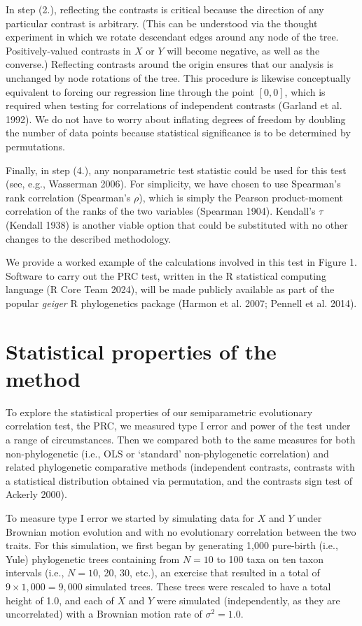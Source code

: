 \documentclass[fleqn,10pt,lineno]{wlpeerj} %
\begin{document}
In step (2.), reflecting the contrasts is critical because the direction of any particular contrast is arbitrary. (This can be understood via the thought experiment in which we rotate descendant edges around any node of the tree. Positively-valued contrasts in \(X\) or \(Y\) will become negative, as well as the converse.) Reflecting contrasts around the origin ensures that our analysis is unchanged by node rotations of the tree. This procedure is likewise conceptually equivalent to forcing our regression line through the point \([0,0]\), which is required when testing for correlations of independent contrasts (Garland et al. 1992). We do not have to worry about inflating degrees of freedom by doubling the number of data points because statistical significance is to be determined by permutations.

Finally, in step (4.), any nonparametric test statistic could be used for this test (see, e.g., Wasserman 2006). For simplicity, we have chosen to use Spearman's rank correlation (Spearman's \(\rho\)), which is simply the Pearson product-moment correlation of the ranks of the two variables (Spearman 1904). Kendall's \(\tau\) (Kendall 1938) is another viable option that could be substituted with no other changes to the described methodology.

We provide a worked example of the calculations involved in this test in Figure 1. Software to carry out the PRC test, written in the R statistical computing language (R Core Team 2024), will be made publicly available as part of the popular \emph{geiger} R phylogenetics package (Harmon et al. 2007; Pennell et al. 2014).

\section{Statistical properties of the method}\label{statistical-properties-of-the-method}

To explore the statistical properties of our semiparametric evolutionary correlation test, the PRC, we measured type I error and power of the test under a range of circumstances. Then we compared both to the same measures for both non-phylogenetic (i.e., OLS or `standard' non-phylogenetic correlation) and related phylogenetic comparative methods (independent contrasts, contrasts with a statistical distribution obtained via permutation, and the contrasts sign test of Ackerly 2000).

To measure type I error we started by simulating data for \(X\) and \(Y\) under Brownian motion evolution and with no evolutionary correlation between the two traits. For this simulation, we first began by generating 1,000 pure-birth (i.e., Yule) phylogenetic trees containing from \(N=10\) to 100 taxa on ten taxon intervals (i.e., \(N=10\), 20, 30, etc.), an exercise that resulted in a total of \(9 \times 1,000 = 9,000\) simulated trees. These trees were rescaled to have a total height of 1.0, and each of \(X\) and \(Y\) were simulated (independently, as they are uncorrelated) with a Brownian motion rate of \(\sigma^2 = 1.0\).
\end{document}
